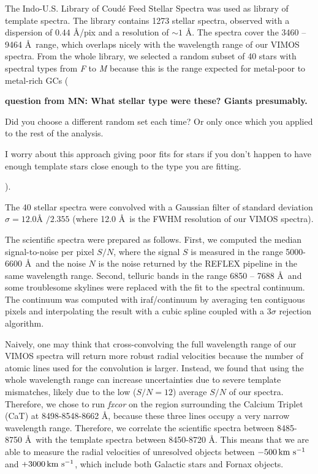 \documentclass[useAMS,usenatbib]{mn2e}
\newcommand{\kms}{\mbox{\,km~s$^{-1}$}}
\begin{document}
The Indo-U.S. Library of Coud\'e Feed Stellar Spectra \citep{Valdes04} was used as library of template spectra. The library contains 1273 stellar spectra, observed with a dispersion of $0.44$ \AA /pix and a resolution of $\sim 1$ \AA . The spectra cover the 3460 -- 9464 \AA\ range, which overlaps nicely with the wavelength range of our VIMOS spectra. From the whole library, we selected a random subset of 40 stars with spectral types from \textit{F} to \textit{M} because this is the range expected for metal-poor to metal-rich GCs ({\bf question from MN: What stellar type were these? Giants presumably.

Did you choose a different random set each time? Or only once which you applied to the rest of the analysis.

I worry about this approach giving poor fits for stars if you don’t happen to have enough template stars close enough to the type you are fitting.
}). 


The 40 stellar spectra were convolved with a Gaussian filter of standard deviation $\sigma = 12.0\mbox{\AA\ } / 2.355$ (where 12.0 \AA\ is the FWHM resolution of our VIMOS spectra). 

The scientific spectra were prepared as follows. First, we computed the median signal-to-noise per pixel $S/N$, where the signal $S$ is measured in the range 5000-6600 \AA\ and the noise $N$ is the noise returned by the REFLEX pipeline in the same wavelength range. Second, telluric bands in the range 6850 -- 7688 \AA\ and some troublesome skylines were replaced with the fit to the spectral continuum. The continuum was computed with iraf/continuum by averaging ten contiguous pixels and interpolating the result with a cubic spline coupled with a $3\sigma$ rejection algorithm.  

Naively, one may think that cross-convolving the full wavelength range of our VIMOS spectra will return more robust radial velocities because the number of atomic lines used for the convolution is larger. Instead, we found that using the whole wavelength range can increase uncertainties due to severe template mismatches, likely due to the low ($S/N = 12$) average $S/N$ of our spectra. Therefore, we chose to run {\it fxcor} on the region surrounding the Calcium Triplet (CaT) at 8498-8548-8662 \AA , because these three lines occupy a very narrow wavelength range. Therefore, we correlate the scientific spectra between 8485-8750 \AA\ with the template spectra between 8450-8720 \AA . This means that we are able to measure the radial velocities of unresolved objects between $-500 \kms$ and $+3000\kms$, which include both Galactic stars and Fornax objects.   
\end{document}
